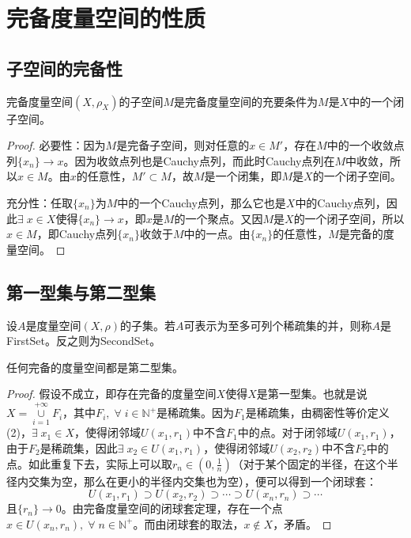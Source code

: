 \section{完备度量空间的性质}
\subsection{子空间的完备性}
\begin{theorem}
	完备度量空间$(X,\rho_X)$的子空间$M$是完备度量空间的充要条件为$M$是$X$中的一个闭子空间。
\end{theorem}
\begin{proof}
	必要性：因为$M$是完备子空间，则对任意的$x\in M'$，存在$M$中的一个收敛点列$\{x_n\}\to x$。因为收敛点列也是Cauchy点列，而此时Cauchy点列在$M$中收敛，所以$x\in M$。由$x$的任意性，$M'\subset M$，故$M$是一个闭集，即$M$是$X$的一个闭子空间。\par
	充分性：任取$\{x_n\}$为$M$中的一个Cauchy点列，那么它也是$X$中的Cauchy点列，因此$\exists\;x\in X$使得$\{x_n\}\to x$，即$x$是$M$的一个聚点。又因$M$是$X$的一个闭子空间，所以$x\in M$，即Cauchy点列$\{x_n\}$收敛于$M$中的一点。由$\{x_n\}$的任意性，$M$是完备的度量空间。
\end{proof}
\subsection{第一型集与第二型集}
\begin{definition}
	设$A$是度量空间$(X,\rho)$的子集。若$A$可表示为至多可列个稀疏集的并，则称$A$是\gls{FirstSet}。反之则为\gls{SecondSet}。
\end{definition}
\begin{theorem}
	任何完备的度量空间都是第二型集。
\end{theorem}
\begin{proof}
	假设不成立，即存在完备的度量空间$X$使得$X$是第一型集。也就是说$X=\underset{i=1}{\overset{+\infty}{\cup}}F_i$，其中$F_i,\;\forall\;i\in\mathbb{N}^+$是稀疏集。因为$F_1$是稀疏集，由稠密性等价定义(2)，$\exists\;x_1\in X$，使得闭邻域$U(x_1,r_1)$中不含$F_1$中的点。对于闭邻域$U(x_1,r_1)$，由于$F_2$是稀疏集，因此$\exists\;x_2\in U(x_1,r_1)$，使得闭邻域$U(x_2,r_2)$中不含$F_2$中的点。如此重复下去，实际上可以取$r_n\in(0,\frac{1}{n})$（对于某个固定的半径，在这个半径内交集为空，那么在更小的半径内交集也为空），便可以得到一个闭球套：
	\begin{equation*}
		U(x_1,r_1)\supset U(x_2,r_2)\supset\cdots\supset U(x_n,r_n)\supset\cdots
	\end{equation*}
	且$\{r_n\}\to0$。由完备度量空间的闭球套定理，存在一个点$x\in U(x_n,r_n),\;\forall\;n\in\mathbb{N}^+$。而由闭球套的取法，$x\notin X$，矛盾。
\end{proof}
